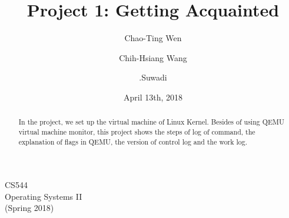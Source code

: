 \documentclass[english,10pt,letterpaper,onecolumn]{IEEEtran}
\title{Project 1: Getting Acquainted}
\author{
  Chao-Ting Wen \hspace{.5cm}
  \and
  Chih-Hsiang Wang \hspace{.5cm}
  \and
  .Suwadi
}
\date{April 13th, 2018}
\begin{document}
\begin{titlepage} 
\maketitle
\begin{center}
CS544\\
Operating Systems II\\
(Spring 2018)
\vspace{50 mm}
\end{center}

\begin{abstract}
In the project, we set up the virtual machine of Linux Kernel. Besides of using QEMU virtual machine monitor, this project shows the steps of log of command, the explanation of flags in QEMU, the version of control log and the work log.
\end{abstract}
\end{titlepage}

\clearpage
\end{document}
